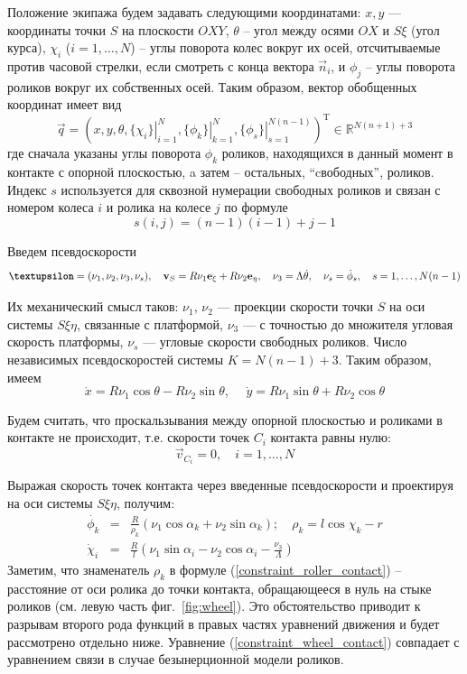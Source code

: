 Положение экипажа будем задавать следующими координатами:
$x, y$ --- координаты точки $S$ на плоскости $OXY$, $\theta$ -- угол между осями $OX$ и $S\xi$ (угол курса),
$\chi_i$ ($i = 1,\dots,N$) -- углы поворота колес вокруг их осей, отсчитываемые против часовой стрелки, если смотреть с конца вектора $\vec{n}_i$, и $\phi_j$ -- углы поворота роликов вокруг их собственных осей.
Таким образом, вектор обобщенных координат имеет вид
$$\vec{q} = (
    x, y, \theta,
    \left.\{\chi_i\}\right|_{i=1}^N ,
    \left.\{\phi_k\}\right|_{k=1}^N,
    \left.\{\phi_s\}\right|_{s=1}^{N(n - 1)}
)^{\mathop{T}}\in\mathbb{R}^{N(n+1) + 3}$$ 
где сначала указаны углы поворота $\phi_k$ роликов, находящихся в данный момент в контакте с опорной плоскостью, a затем -- остальных, ``cвободных'', роликов. Индекс $s$ используется для сквозной нумерации свободных роликов и связан с номером колеса $i$ и ролика на колесе $j$ по формуле
\begin{equation}\label{eq:num}
    s(i, j) = (n-1)(i-1) + j - 1
\end{equation}

Введем псевдоскорости
$$\vnu = (\nu_1, \nu_2, \nu_3, \nu_s), \quad \vec{v}_S = R\nu_1\vec{e}_\xi + R\nu_2\vec{e}_\eta, \quad \nu_3 = \Lambda\dot{\theta},\quad \nu_s = \dot{\phi}_s, \quad s = 1,\ldots,N(n-1)$$

Их механический смысл таков: $\nu_1$, $\nu_2$ --- проекции скорости точки $S$ на оси системы $S\xi\eta$, связанные с платформой, $\nu_3$ --- с точностью до множителя угловая скорость платформы, $\nu_s$ --- угловые скорости свободных роликов. Число независимых псевдоскоростей системы $K = N(n-1)+3$. Таким образом, имеем
$$ \dot{x} = R \nu_1\cos\theta-R\nu_2\sin\theta, \hspace{15pt} \dot{y} = R\nu_1\sin\theta+R\nu_2\cos\theta$$

Будем считать, что проскальзывания между опорной плоскостью и роликами в контакте не происходит, т.е.
скорости точек $C_i$ контакта равны нулю:
$$\vec{v}_{C_i} = 0,\quad i = 1,\dots, N$$

Выражая скорость точек контакта через введенные псевдоскорости и проектируя на оси системы $S\xi\eta$, получим:
\begin{eqnarray}
\dot{\phi_k} &=& \frac{R}{\rho_k }(\nu_1\cos\alpha_k + \nu_2\sin\alpha_k); \quad \rho_k  = l\cos\chi_k - r \label{constraint_roller_contact}\\
\dot{\chi}_i &=& \frac{R}{l}(\nu_1\sin\alpha_i - \nu_2\cos\alpha_i - \frac{\nu_3}{\Lambda})\label{constraint_wheel_contact}
\end{eqnarray}
Заметим, что знаменатель $\rho_k$ в формуле (\ref{constraint_roller_contact}) -- расстояние от оси ролика до точки контакта, обращающееся в нуль на стыке роликов (см. левую часть фиг.~\ref{fig:wheel}). Это обстоятельство приводит к разрывам второго рода функций в правых частях уравнений движения и будет рассмотрено отдельно ниже.
Уравнение (\ref{constraint_wheel_contact}) совпадает с уравнением связи в случае безынерционной модели роликов. 

